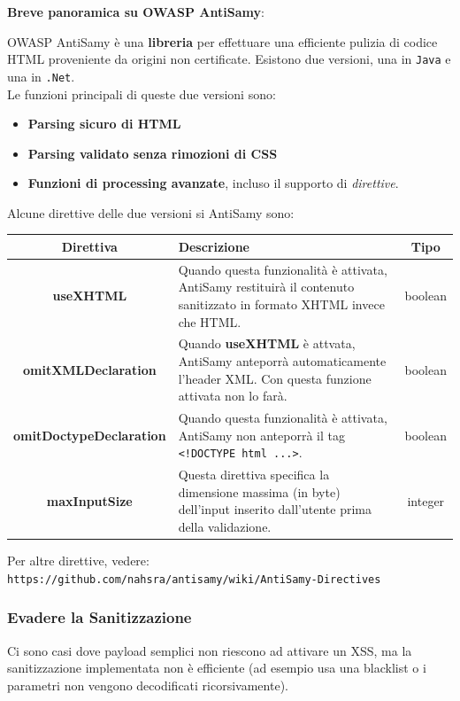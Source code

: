 \documentclass{article}
\begin{document}
\newpage

\textbf{Breve panoramica su OWASP AntiSamy}:

OWASP AntiSamy è una \textbf{libreria} per effettuare una efficiente pulizia di codice HTML proveniente da origini non certificate. Esistono due versioni, una in \verb|Java| e una in \verb|.Net|.\\ Le funzioni principali di queste due versioni sono:
\begin{itemize}
	\item \textbf{Parsing sicuro di HTML}
	\item \textbf{Parsing validato senza rimozioni di CSS}
	\item \textbf{Funzioni di processing avanzate}, incluso il supporto di \textit{direttive}.
\end{itemize}

Alcune direttive delle due versioni si AntiSamy sono:

\begin{table}[H]
\centering
\begin{tabular}{|c|m{7 cm}|c|}
	\hline
	\textbf{Direttiva} & \textbf{Descrizione} & \textbf{Tipo} \\
	\hline
	\textbf{useXHTML} & Quando questa funzionalità è attivata, AntiSamy restituirà il contenuto sanitizzato in formato XHTML invece che HTML. & boolean \\
	\hline
	\textbf{omitXMLDeclaration} & Quando \textbf{useXHTML} è attvata, AntiSamy anteporrà automaticamente l'header XML. Con questa funzione attivata non lo farà. & boolean \\
	\hline
	\textbf{omitDoctypeDeclaration} & Quando questa funzionalità è attivata, AntiSamy non anteporrà il tag \verb|<!DOCTYPE html ...>|. & boolean \\
	\hline
	\textbf{maxInputSize} & Questa direttiva specifica la dimensione massima (in byte) dell'input inserito dall'utente prima della validazione. & integer \\
	\hline
\end{tabular}
\end{table}

Per altre direttive, vedere: \verb|https://github.com/nahsra/antisamy/wiki/AntiSamy-Directives|

\subsubsection{Evadere la Sanitizzazione}
Ci sono casi dove payload semplici non riescono ad attivare un XSS, ma la sanitizzazione implementata non è efficiente (ad esempio usa una blacklist o i parametri non vengono decodificati ricorsivamente).
\end{document}
